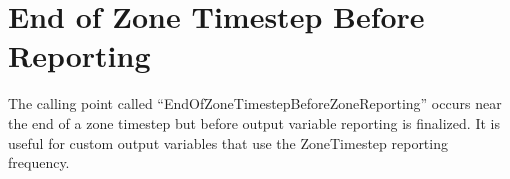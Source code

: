 \section{End of Zone Timestep Before Reporting}\label{end-of-zone-timestep-before-reporting}

The calling point called ``EndOfZoneTimestepBeforeZoneReporting'' occurs near the end of a zone timestep but before output variable reporting is finalized. It is useful for custom output variables that use the ZoneTimestep reporting frequency.
